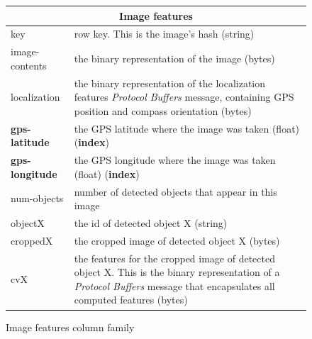 \documentclass[a4paper,onecolumn,oneside,titlepage,11pt]{report}
\begin{document}
	\begin{figure}[H]
	\begin{center}
		\begin{tabularx}{\linewidth}{|l|X|}
				\hline
				\multicolumn{2}{|c|}{\textbf{Image features}} \\
				\hline
				key & row key. This is the image's hash (string) \\
				\hline
				image-contents & the binary representation of the image (bytes) \\
				localization & the binary representation of the localization features \emph{Protocol Buffers} message, containing GPS position and compass orientation (bytes) \\
				\textbf{gps-latitude} & the GPS latitude where the image was taken (float) (\textbf{index}) \\
				\textbf{gps-longitude} & the GPS longitude where the image was taken (float) (\textbf{index}) \\
				num-objects & number of detected objects that appear in this image \\
				objectX & the id of detected object X (string) \\
				croppedX & the cropped image of detected object X (bytes)\\
				cvX & the features for the cropped image of detected object X. This is the binary representation of a \emph{Protocol Buffers} message that encapsulates all computed features (bytes) \\
				\hline
			\end{tabularx}
	\end{center}
	\caption{Image features column family}
	\end{figure}	
	
\end{document}
